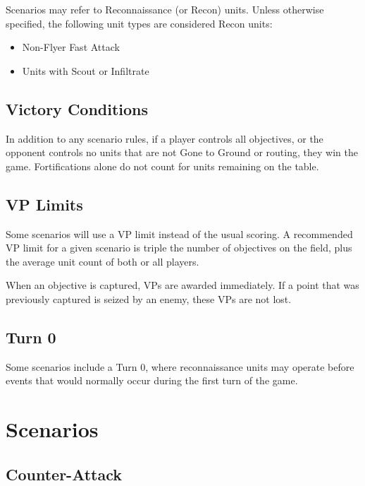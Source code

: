 \documentclass[letterpaper,twocolumn,oneside,titlepage]{book}
\providecommand{\tightlist}{%
  \setlength{\itemsep}{0pt}\setlength{\parskip}{0pt}}
\begin{document}
Scenarios may refer to Reconnaissance (or Recon) units. Unless otherwise
specified, the following unit types are considered Recon units:

\begin{itemize}
\tightlist
\item
  Non-Flyer Fast Attack\\
\item
  Units with Scout or Infiltrate
\end{itemize}

\section{\texorpdfstring{\textbf{Victory
Conditions}}{Victory Conditions}}\label{victory-conditions}

In addition to any scenario rules, if a player controls all objectives,
or the opponent controls no units that are not Gone to Ground or
routing, they win the game. Fortifications alone do not count for units
remaining on the table.

\section{\texorpdfstring{\textbf{VP
Limits}}{VP Limits}}\label{vp-limits}

Some scenarios will use a VP limit instead of the usual scoring. A
recommended VP limit for a given scenario is triple the number of
objectives on the field, plus the average unit count of both or all
players.

When an objective is captured, VPs are awarded immediately. If a point
that was previously captured is seized by an enemy, these VPs are not
lost.

\section{\texorpdfstring{\textbf{Turn 0}}{Turn 0}}\label{turn-0}

Some scenarios include a Turn 0, where reconnaissance units may operate
before events that would normally occur during the first turn of the
game.

\chapter{Scenarios}\label{scenarios}

\section{Counter-Attack}\label{counter-attack}
\end{document}
